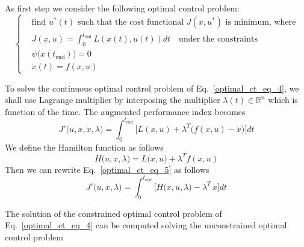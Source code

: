 \documentclass[11pt,a4paper,oneside]{book}
\numberwithin{equation}{section}
\theoremstyle{it}
\theoremstyle{definition}
\begin{document}
As first step we consider the following optimal control problem: 
\begin{equation}\label{optimal_ct_eq_4}
	\left\lbrace \begin{aligned}
		& \text{find $u^*(t)$ such that the cost functional $J(x,u^*)$ is 
			minimum, where} \\[8pt]
		& J(x,u) = \int_{0}^{t_{\text{end}}}L(x(t),u(t))dt \quad\text{under the 
			constraints} \\[8pt]
		& \psi\big(x(t_{\text{end}})\big) = 0 \\[8pt]
		& \dot{x}(t)=f(x,u) 
	\end{aligned}\right. 
\end{equation}
\begin{mybox}
	To solve the continuous optimal control problem of Eq.~\eqref{optimal_ct_eq_4}, we shall use Lagrange 
	multiplier by interposing the multiplier $\lambda(t)\in\mathbb{R}^n$ which is 
	function of the time. The augmented performance index becomes
	\begin{equation}\label{optimal_ct_eq_5}
		J'\big(u,x,\dot{x},\lambda\big) = 
		\int_{0}^{t_{\text{end}}}\Bigg[L(x,u)+\lambda^T\Big(f(x,u)-\dot{x}\Big)\Bigg]dt
	\end{equation}
	We define the Hamilton function as follows
	\begin{equation}\label{optimal_ct_eq_6}
		H\big(u,x,\lambda\big) = L\big(x,u\big)+\lambda^Tf(x,u)
	\end{equation} 
	Then we can rewrite Eq.~\eqref{optimal_ct_eq_5} as follows
	\begin{equation}\label{optimal_ct_eq_7}
		J'\big(u,x,\lambda\big) = \int_{0}^{t_{\text{end}}}\Bigg[H\big(x,u,\lambda\big) - 
		\lambda^T\,\dot{x}\Bigg]dt
	\end{equation}
\end{mybox}
The solution of the constrained optimal control problem of Eq.~\eqref{optimal_ct_eq_4} can be computed solving the unconstrained optimal control problem
\end{document}
